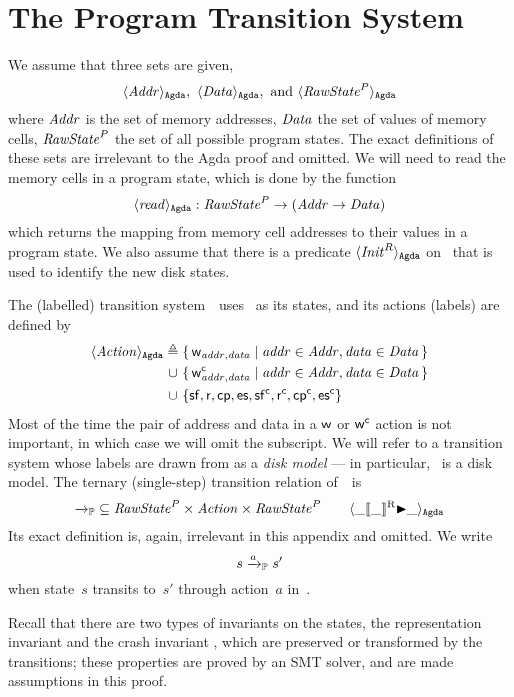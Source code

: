 
\section{The Program Transition System~\Prog}
\label{sec:Prog}

We assume that three sets are given,  
$$ \langle \mathit{Addr} \rangle_\mathtt{Agda},\ \langle \mathit{Data} \rangle_\mathtt{Agda},\ \text{and}\ \langle \mathit{RawState}^P \rangle_\mathtt{Agda} $$
where $\mathit{Addr}$ is the set of memory addresses, $\mathit{Data}$ the set of values of memory cells, $\mathit{RawState}^P$ the set of all possible program states.
The exact definitions of these sets are irrelevant to the Agda proof and omitted.
We will need to read the memory cells in a program state, which is done by the function
$$ \langle \mathit{read} \rangle_\mathtt{Agda} : \mathit{RawState}^P \to (\mathit{Addr} \to \mathit{Data}) $$
which returns the mapping from memory cell addresses to their values in a program state.
We also assume that there is a predicate $\langle \mathit{Init}^R \rangle_\mathtt{Agda}$ on \ProgState\ that is used to identify the new disk states.

The (labelled) transition system~\Prog\ uses \ProgState\ as its states, and its actions (labels) are defined by
\begin{align*}
	\langle \mathit{Action} \rangle_\mathtt{Agda} {}\triangleq{}{} &\{\, \mathsf w_{\mathit{addr}, \mathit{data}} \mid \mathit{addr} \in \mathit{Addr}, \mathit{data} \in \mathit{Data} \,\} \\
	\cup \ &\{\, \mathsf w^\mathsf{c}_{\mathit{addr}, \mathit{data}} \mid \mathit{addr} \in \mathit{Addr}, \mathit{data} \in \mathit{Data} \,\}\\
	\cup \ &\{ \mathsf{sf}, \mathsf r, \mathsf{cp}, \mathsf{es}, \mathsf{sf^c}, \mathsf{r^c}, \mathsf{cp^c}, \mathsf{es^c} \}
\end{align*}
Most of the time the pair of address and data in a $\mathsf w$ or $\mathsf w^\mathsf{c}$ action is not important, in which case we will omit the subscript.
We will refer to a transition system whose labels are drawn from  as a \emph{disk model} --- in particular, \Prog\ is a disk model.
The ternary (single-step) transition relation of~\Prog\ is
$$ {\xrightarrow{}_{\mathbb P}} \subseteq \mathit{RawState}^P \times \mathit{Action} \times \mathit{RawState}^P \qquad \langle \_[\kern-1.5pt[\_]\kern-1.5pt]^{\mathrm R}{\blacktriangleright}\_ \rangle_\mathtt{Agda} $$
Its exact definition is, again, irrelevant in this appendix and omitted.
We write
$$s \xrightarrow{a}_{\mathbb P} s'$$
when state~$s$ transits to~$s'$ through action~$a$ in~\Prog.

Recall that there are two types of invariants on the states, the representation invariant  and the crash invariant , which are preserved or transformed by the transitions; these properties are proved by an SMT solver, and are made assumptions in this proof.

